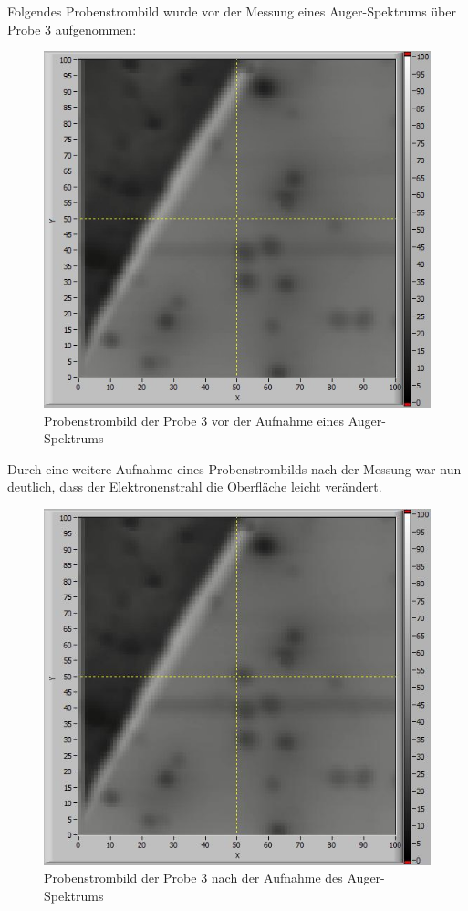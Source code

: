 	Folgendes Probenstrombild wurde vor der Messung eines Auger-Spektrums über Probe 3 aufgenommen:

	\begin{figure}[H]
		\center
		\includegraphics[scale=0.4]{voher.jpg}
		\caption{Probenstrombild der Probe 3 vor der Aufnahme eines Auger-Spektrums}
	\end{figure}

	Durch eine weitere Aufnahme eines Probenstrombilds nach der Messung war nun deutlich, dass der Elektronenstrahl die Oberfläche leicht verändert.

	\begin{figure}[H]
		\center
		\includegraphics[scale=0.4]{nachher.jpg}
		\caption{Probenstrombild der Probe 3 nach der Aufnahme des Auger-Spektrums}
	\end{figure}

